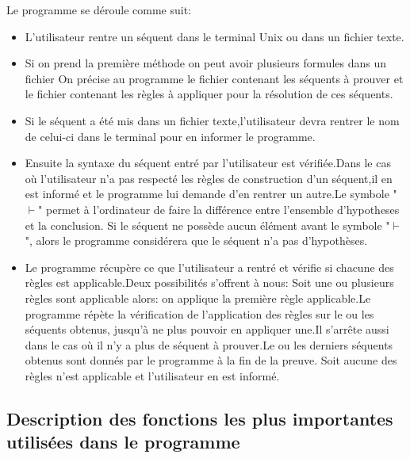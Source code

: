 \documentclass[a4paper,12pt]{article}
\begin{document}
Le programme se déroule comme suit:
\begin{itemize}
 \item L'utilisateur rentre un séquent dans le terminal Unix ou dans un fichier texte.
 \item Si on prend la première méthode on peut avoir plusieurs formules dans un fichier On précise au programme le fichier contenant les séquents à prouver et le fichier contenant les règles à appliquer pour la résolution de ces séquents.
 \item Si le séquent a été mis dans un fichier texte,l'utilisateur devra rentrer le nom de celui-ci dans le terminal pour en informer le programme.
 \item Ensuite la syntaxe du séquent entré par l'utilisateur est vérifiée.Dans le cas où l'utilisateur n'a pas respecté les règles de construction d'un séquent,il en est informé et le programme
 lui demande d'en rentrer un autre.Le symbole "$\vdash$" permet à l'ordinateur de faire la différence entre l'ensemble d'hypotheses et la conclusion. Si le séquent ne possède aucun élément avant le symbole "$\vdash$", alors le programme considérera que le séquent n'a pas d'hypothèses.\\
 \item Le programme récupère ce que l'utilisateur a rentré et vérifie si chacune des règles est applicable.Deux possibilités s'offrent à nous:
 \subitem Soit une ou plusieurs règles sont applicable alors: on applique la première règle applicable.Le programme répète la vérification de l'application des règles sur le ou les séquents obtenus, 
 jusqu'à ne plus pouvoir en appliquer une.Il s'arrête aussi dans le cas où il n'y a plus de séquent à prouver.Le ou les derniers séquents obtenus sont donnés par le programme à la fin de la preuve.
 \subitem Soit aucune des règles n'est applicable et l'utilisateur en est informé. 
 
 
 
 
 
 
\end{itemize}

\subsection{Description des fonctions les plus importantes utilisées dans le programme}
\end{document}
